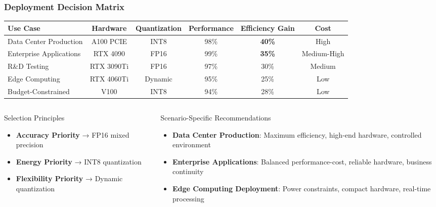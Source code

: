 \documentclass[aspectratio=169,xcolor=dvipsnames]{beamer}
\begin{document}
\begin{frame}
\frametitle{Deployment Decision Matrix}

\begin{table}[h]
\centering
\scriptsize
\begin{tabular}{@{}lccccc@{}}
\toprule
\textbf{Use Case} & \textbf{Hardware} & \textbf{Quantization} & \textbf{Performance} & \textbf{Efficiency Gain} & \textbf{Cost} \\
\midrule
Data Center Production & A100 PCIE & INT8 & 98\% & \textbf{40\%} & High \\
Enterprise Applications & RTX 4090 & FP16 & 99\% & \textbf{35\%} & Medium-High \\
R\&D Testing & RTX 3090Ti & FP16 & 97\% & 30\% & Medium \\
Edge Computing & RTX 4060Ti & Dynamic & 95\% & 25\% & Low \\
Budget-Constrained & V100 & INT8 & 94\% & 28\% & Low \\
\bottomrule
\end{tabular}
\end{table}

\begin{columns}[c]
\begin{exampleblock}{Selection Principles}
\begin{itemize}
\item \textbf{Accuracy Priority} → FP16 mixed precision
\item \textbf{Energy Priority} → INT8 quantization
\item \textbf{Flexibility Priority} → Dynamic quantization
\end{itemize}
\end{exampleblock}

\begin{block}{Scenario-Specific Recommendations}
\begin{itemize}
\item \textbf{Data Center Production}: Maximum efficiency, high-end hardware, controlled environment
\item \textbf{Enterprise Applications}: Balanced performance-cost, reliable hardware, business continuity
\item \textbf{Edge Computing Deployment}: Power constraints, compact hardware, real-time processing
\end{itemize}
\end{block}

\end{columns}
\end{frame}
\end{document}
